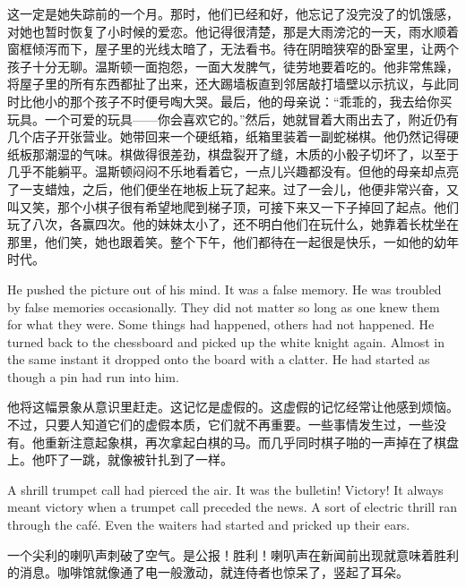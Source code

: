 \begin{paracol}{2}
这一定是她失踪前的一个月。那时，他们已经和好，他忘记了没完没了的饥饿感，对她也暂时恢复了小时候的爱恋。他记得很清楚，那是大雨滂沱的一天，雨水顺着窗框倾泻而下，屋子里的光线太暗了，无法看书。待在阴暗狭窄的卧室里，让两个孩子十分无聊。温斯顿一面抱怨，一面大发脾气，徒劳地要着吃的。他非常焦躁，将屋子里的所有东西都扯了出来，还大踢墙板直到邻居敲打墙壁以示抗议，与此同时比他小的那个孩子不时便号啕大哭。最后，他的母亲说：``乖乖的，我去给你买玩具。一个可爱的玩具——你会喜欢它的。''然后，她就冒着大雨出去了，附近仍有几个店子开张营业。她带回来一个硬纸箱，纸箱里装着一副蛇梯棋。他仍然记得硬纸板那潮湿的气味。棋做得很差劲，棋盘裂开了缝，木质的小骰子切坏了，以至于几乎不能躺平。温斯顿闷闷不乐地看着它，一点儿兴趣都没有。但他的母亲却点亮了一支蜡烛，之后，他们便坐在地板上玩了起来。过了一会儿，他便非常兴奋，又叫又笑，那个小棋子很有希望地爬到梯子顶，可接下来又一下子掉回了起点。他们玩了八次，各赢四次。他的妹妹太小了，还不明白他们在玩什么，她靠着长枕坐在那里，他们笑，她也跟着笑。整个下午，他们都待在一起很是快乐，一如他的幼年时代。

\switchcolumn*

He pushed the picture out of his mind. It was a false memory. He was
troubled by false memories occasionally. They did not matter so long as
one knew them for what they were. Some things had happened, others had
not happened. He turned back to the chessboard and picked up the white
knight again. Almost in the same instant it dropped onto the board with
a clatter. He had started as though a pin had run into him.

\switchcolumn

他将这幅景象从意识里赶走。这记忆是虚假的。这虚假的记忆经常让他感到烦恼。不过，只要人知道它们的虚假本质，它们就不再重要。一些事情发生过，一些没有。他重新注意起象棋，再次拿起白棋的马。而几乎同时棋子啪的一声掉在了棋盘上。他吓了一跳，就像被针扎到了一样。

\switchcolumn*

A shrill trumpet call had pierced the air. It was the bulletin! Victory!
It always meant victory when a trumpet call preceded the news. A sort of
electric thrill ran through the café. Even the waiters had started and
pricked up their ears.

\switchcolumn

一个尖利的喇叭声刺破了空气。是公报！胜利！喇叭声在新闻前出现就意味着胜利的消息。咖啡馆就像通了电一般激动，就连侍者也惊呆了，竖起了耳朵。

\switchcolumn*


\end{paracol}
